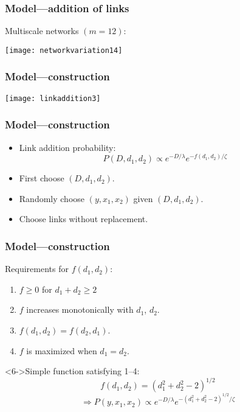 \begin{frame}
  \frametitle{Model---addition of links}

  \begin{block}{Multiscale networks $(m=12)$:}
    \begin{center}
      \texttt{[image: networkvariation14]}
    \end{center}
  \end{block}

\end{frame}


\begin{frame}
  \frametitle{Model---construction}

  \begin{center}
    \texttt{[image: linkaddition3]}
  \end{center}

\end{frame}

\begin{frame}
  \frametitle{Model---construction}

  \begin{block}{}
    \begin{itemize}
    \item<1-> 
      Link addition probability:
      $$
      P(D,d_1,d_2) 
      \propto 
      e^{-D/\lambda} e^{-f(d_1,d_2)/\zeta}
      $$
    \item<1-> 
      First choose $(D,d_1,d_2)$.
    \item<1-> 
      Randomly choose $(y,x_1,x_2)$ given $(D,d_1,d_2)$.
    \item<1-> 
      Choose links without replacement.
    \end{itemize}
  \end{block}

\end{frame}

\begin{frame}
  \frametitle{Model---construction}

  \begin{block}{Requirements for $f(d_1,d_2)$:}
    \begin{enumerate}
    \item<2-> 
      $f \geq 0$ for $d_1+d_2 \geq 2$
    \item<3->
      $f$ increases monotonically with $d_1$, $d_2$.
    \item<4->
      $f(d_1,d_2) = f(d_2,d_1)$.
    \item<5->
      $f$ is maximized when $d_1=d_2$.
    \end{enumerate}
  \end{block}

  \begin{block}<6->{Simple function satisfying 1--4:}
    $$
    f(d_1,d_2) = (d_1^2 + d_2^2-2)^{1/2}
    $$
    $$
    \Rightarrow
    P(y,x_1,x_2) \propto e^{-D/\lambda} e^{-(d_1^2 + d_2^2-2)^{1/2}/\zeta} 
    $$  
  \end{block}

\end{frame}

